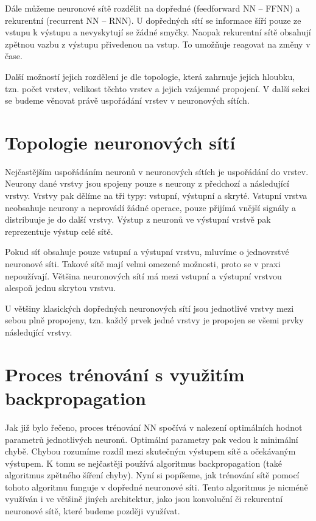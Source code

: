 Dále můžeme neuronové sítě rozdělit na dopředné (feedforward NN – FFNN) a
rekurentní (recurrent NN – RNN). U dopředných sítí se informace šíří pouze ze
vstupu k výstupu a nevyskytují se žádné smyčky. Naopak rekurentní sítě obsahují
zpětnou vazbu z výstupu přivedenou na vstup. To umožňuje reagovat na změny v
čase.

Další možností jejich rozdělení je dle topologie, která zahrnuje jejich
hloubku, tzn. počet vrstev, velikost těchto vrstev a jejich vzájemné propojení.
V další sekci se budeme věnovat právě uspořádání vrstev v neuronových sítích.

\section{Topologie neuronových sítí}
Nejčastějším uspořádáním neuronů v neuronových sítích je uspořádání do vrstev. Neurony dané
vrstvy jsou spojeny pouze s neurony z předchozí a následující vrstvy. Vrstvy
pak dělíme na tři typy: vstupní, výstupní a skryté. Vstupní vrstva neobsahuje
neurony a neprovádí žádné operace, pouze přijímá vnější signály a distribuuje
je do další vrstvy. Výstup z neuronů ve výstupní vrstvě pak reprezentuje výstup
celé sítě.

Pokud síť obsahuje pouze vstupní a výstupní vrstvu, mluvíme o jednovrstvé
neuronové síti. Takové sítě mají velmi omezené možnosti, proto se v praxi
nepoužívají. Většina neuronových sítí má mezi vstupní a výstupní vrstvou
alespoň jednu skrytou vrstvu.%

U většiny klasických dopředných neuronových sítí jsou jednotlivé vrstvy mezi
sebou plně propojeny, tzn. každý prvek jedné vrstvy je propojen se všemi prvky
následující vrstvy.


\section{Proces trénování s využitím backpropagation}

Jak již bylo řečeno, proces trénování NN spočívá v nalezení optimálních hodnot
parametrů jednotlivých neuronů. Optimální parametry pak vedou k minimální
chybě. Chybou rozumíme rozdíl mezi skutečným výstupem sítě a očekávaným
výstupem. K tomu se nejčastěji používá algoritmus backpropagation (také
algoritmus zpětného šíření chyby). Nyní si popíšeme, jak trénování sítě pomocí
tohoto algoritmu funguje v dopředné neuronové síti. Tento algoritmus je nicméně využíván i ve většině jiných architektur, jako jsou konvoluční či rekurentní
neuronové sítě, které budeme později využívat.

